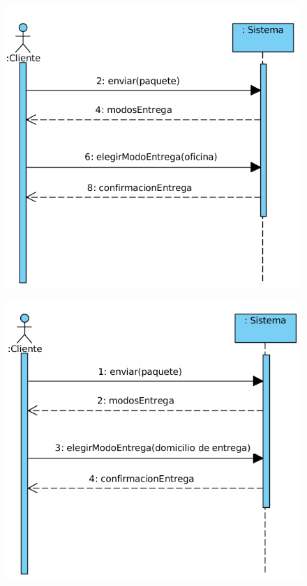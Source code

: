 \begin{figure}[H]
	\centering
	\includegraphics[width=16cm]{48}
\end{figure}
\begin{figure}[H]
	\centering
	\includegraphics[width=16cm]{49}
\end{figure}
